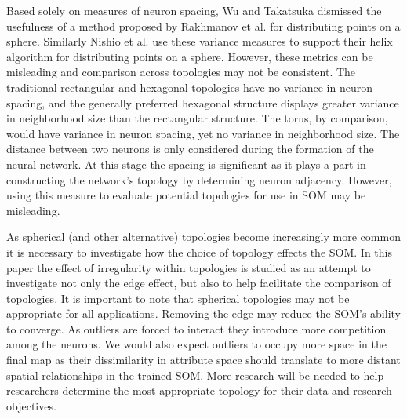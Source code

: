Based solely on measures of neuron spacing, Wu and Takatsuka \cite{wu2005} dismissed the usefulness of a method
proposed by Rakhmanov et al. \cite{Rakhmanov94} for distributing points on a sphere.
Similarly Nishio et al.
\cite{Nishio:2006fk} use these variance measures to support their helix
algorithm for distributing points on a sphere.  However,
these metrics can be misleading and comparison across topologies may not be
consistent.  The traditional rectangular and hexagonal topologies have no
variance in neuron spacing, and the generally preferred hexagonal structure
displays greater variance in neighborhood size than the rectangular structure.
The torus, by comparison, would have variance in neuron spacing, yet no
variance in neighborhood size.  The distance between two neurons is only
considered during the formation of the neural network.  At this stage the
spacing is significant as it plays a part in constructing the network's
topology by determining neuron adjacency.  However, using this measure to
evaluate potential topologies for use in SOM may be misleading.

As spherical (and other alternative) topologies become
increasingly more common it is necessary to investigate how the choice of
topology effects the SOM.  In this paper the effect of irregularity within
topologies is studied as an attempt to investigate not only the edge effect,
but also to help facilitate the comparison of topologies.  It is important to
note that spherical topologies may not be appropriate for all applications.
Removing the edge may reduce the SOM's ability to converge.  As outliers are
forced to interact they introduce more competition among the neurons.  We
would also expect outliers to occupy more space in the final map as their
dissimilarity in attribute space should translate to more distant spatial
relationships in the trained SOM.  More research will be needed to help
researchers determine the most appropriate topology for their data and
research objectives.

